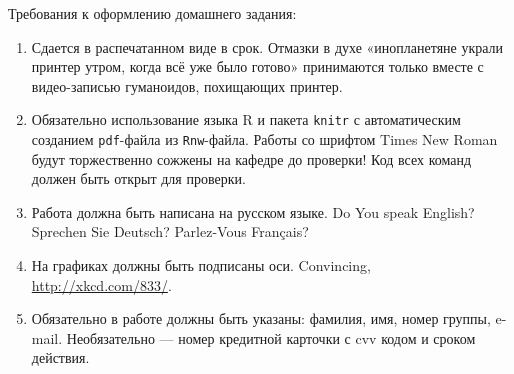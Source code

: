 \documentclass[12pt, a4paper]{article}\usepackage[]{graphicx}\usepackage[]{color}
\begin{document}
Требования к оформлению домашнего задания:
\vspace{0.5cm}
\begin{enumerate}
\item Сдается в распечатанном виде в срок. Отмазки в духе «инопланетяне украли принтер утром, когда всё уже было готово» принимаются только вместе с видео-записью гуманоидов, похищающих принтер.
\item Обязательно использование языка R и пакета \verb|knitr| с автоматическим созданием \verb|pdf|-файла из \verb|Rnw|-файла. Работы со шрифтом Times New Roman будут торжественно сожжены на кафедре до проверки! Код всех команд должен быть открыт для проверки.
\item Работа должна быть написана на русском языке. Do You speak English? Sprechen Sie Deutsch? Parlez-Vous Français?
\item На графиках должны быть подписаны оси. Convincing, \url{http://xkcd.com/833/}.
\item Обязательно в работе должны быть указаны: фамилия, имя, номер группы, e-mail. Необязательно —  номер кредитной карточки с cvv кодом и сроком действия.
\end{enumerate}
\end{document}
